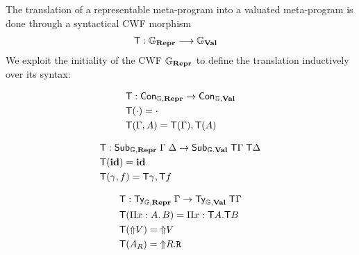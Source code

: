 The translation of a representable meta-program into a valuated meta-program is
done through a syntactical CWF morphism
\begin{align*}
  {\textsf{T}} : {\mathbb{G}}_{\textbf{Repr}} & \longrightarrow {\mathbb{G}}_{\textbf{Val}}
\end{align*}
We exploit the initiality of the CWF ${\mathbb{G}}_{\textbf{Repr}}$ to define the translation
inductively over its syntax:

\begin{align*}
   & {\textsf{T}}            : {\textsf{Con}}_{{\mathbb{G}}, \textbf{Repr}} \to {\textsf{Con}}_{{\mathbb{G}}, \textbf{Val}} \\
   & {\textsf{T}}(\cdot)     = \cdot                                   \\
   & {\textsf{T}}(\Gamma, A) = {\textsf{T}}(\Gamma), {\textsf{T}}(A)
\end{align*}

\begin{align*}
   & {\textsf{T}}            : {\textsf{Sub}}_{{\mathbb{G}}, \textbf{Repr}} \; \Gamma \; \Delta \to {\textsf{Sub}}_{{\mathbb{G}}, \textbf{Val}}\; {\textsf{T}}\Gamma \; {\textsf{T}}\Delta \\
   & {\textsf{T}}(\textbf{id})  = \textbf{id}                                                                                   \\
   & {\textsf{T}}(\gamma, f) = {\textsf{T}} \gamma , {\textsf{T}} f
\end{align*}

\begin{align*}
   & {\textsf{T}}            : {\textsf{Ty}}_{{\mathbb{G}}, \textbf{Repr}} \; {\Gamma} \to {\textsf{Ty}}_{{\mathbb{G}}, \textbf{Val}}\; {\textsf{T}} \Gamma \\
   & {\textsf{T}}(\Pi x : A .\, B)  = \Pi x : {\textsf{T}} A . {\textsf{T}} B                                \\
   & {\textsf{T}}(\text{$\Uparrow$}{V}) = \text{$\Uparrow$}{V}                                                             \\
   & {\textsf{T}}(A_R) = \text{$\Uparrow$}{R}.\texttt{R}
\end{align*}

